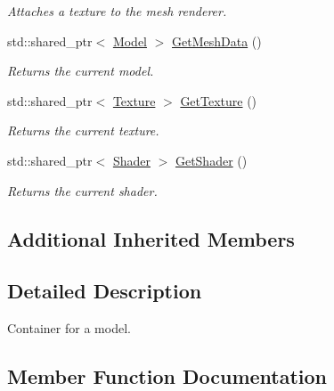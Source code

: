 \begin{DoxyCompactItemize}
\begin{DoxyCompactList}\small\item\em Attaches a texture to the mesh renderer. \end{DoxyCompactList}\item 
std\+::shared\+\_\+ptr$<$ \hyperlink{classfrontier_1_1_model}{Model} $>$ \hyperlink{classfrontier_1_1_mesh_renderer_a082036277e00227a57a16a542e2b57e3}{Get\+Mesh\+Data} ()
\begin{DoxyCompactList}\small\item\em Returns the current model. \end{DoxyCompactList}\item 
std\+::shared\+\_\+ptr$<$ \hyperlink{classfrontier_1_1_texture}{Texture} $>$ \hyperlink{classfrontier_1_1_mesh_renderer_a408e31822fdceac2dd5c85527c47b100}{Get\+Texture} ()
\begin{DoxyCompactList}\small\item\em Returns the current texture. \end{DoxyCompactList}\item 
std\+::shared\+\_\+ptr$<$ \hyperlink{classfrontier_1_1_shader}{Shader} $>$ \hyperlink{classfrontier_1_1_mesh_renderer_a55c8a2d3b8f64767e5b1bcf2a28ec044}{Get\+Shader} ()
\begin{DoxyCompactList}\small\item\em Returns the current shader. \end{DoxyCompactList}\end{DoxyCompactItemize}
\subsection*{Additional Inherited Members}


\subsection{Detailed Description}
Container for a model. 

\subsection{Member Function Documentation}
\mbox{\label{classfrontier_1_1_mesh_renderer_a8be0a3e04dc5c9e56e230c914e58c2dc}} 
